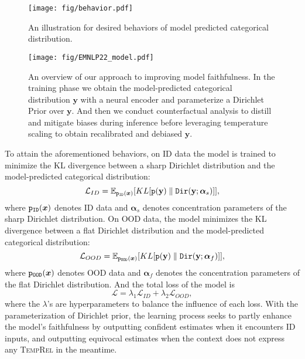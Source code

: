 \documentclass[11pt]{article}
\newcommand{\temprel}{\textsc{TempRel}\xspace}
\newcommand{\yb}{\mathbf{y}}
\begin{document}
\begin{figure}[t]
    \centering
    \texttt{[image: fig/behavior.pdf]}
     \vspace{-0.5em}
    \caption{An illustration for desired behaviors of model predicted categorical distribution.}
    \label{fig:behavior}
     \vspace{-0.5em}
\end{figure}
\begin{figure*}[t]
    \centering
    \texttt{[image: fig/EMNLP22\_model.pdf]}
    \vspace{-1em}
    \caption{An overview of our approach to improving model faithfulness. In the training phase we obtain the model-predicted categorical distribution $\yb$ with a neural encoder and parameterize a Dirichlet Prior over $\yb$. And then we conduct counterfactual analysis to distill and mitigate biases during inference before leveraging temperature scaling to obtain recalibrated and debiased $\yb$.}
    \label{fig:model}
    \vspace{-0.5em}
\end{figure*}

To attain the aforementioned behaviors, on ID data the model is trained to minimize the KL divergence between a sharp Dirichlet distribution and the model-predicted categorical distribution:
\begin{equation}
\label{eqn:id_loss}
\mathcal{L}_{ID} = \displaystyle \mathop{\mathbb{E}_{{\tt p_{ID}}(\bm{x})}}[KL[{\tt p}(\yb) \parallel {\tt Dir}(\yb;\bm{\alpha}_{s})]],
\end{equation}
where ${\tt p_{ID}}(\bm{x})$ denotes ID data and $\bm{\alpha}_{s}$ denotes concentration parameters of the sharp Dirichlet distribution.
On OOD data, the model minimizes the KL divergence between a flat Dirichlet distribution and the model-predicted categorical distribution:
\begin{equation}
\label{eqn:ood_loss}
\mathcal{L}_{OOD} = \mathbb{E}_{{\tt p_{OOD}}(\bm{x})}[KL[{\tt p}(\yb) \parallel {\tt Dir}(\yb;\bm{\alpha}_{f})]],
\end{equation}
where ${\tt p_{OOD}}(\bm{x})$ denotes OOD data and $\bm{\alpha}_{f}$ denotes the concentration parameters of the flat Dirichlet distribution.
And the total loss of the model is 
\begin{equation}
    \label{eqn:loss}
    \mathcal{L} = \lambda_1 \mathcal{L}_{ID} + \lambda_2 \mathcal{L}_{OOD},
\end{equation}
where the $\lambda$'s are hyperparameters to balance the influence of each loss.
With the parameterization of Dirichlet prior, the learning process seeks to partly enhance the model's faithfulness by outputting confident estimates when it encounters ID inputs, and outputting equivocal estimates when the context does not express any \temprel in the meantime.
\end{document}
